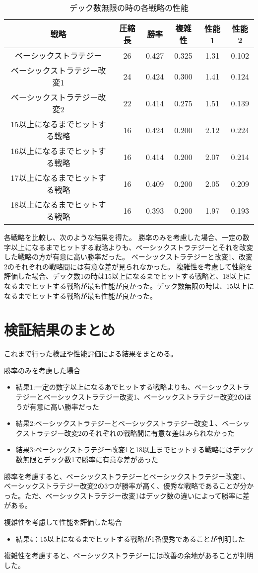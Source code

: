 \begin{table}[H]
\caption{デック数無限の時の各戦略の性能}
\label{table:data_type5}
\begin{center}
\begin{tabular}{|c|c|c|c|c|c|}
\hline
戦略           & 圧縮長 & 勝率    & 複雑性   & 性能1  & 性能2   \\ \hline
ベーシックストラテジー         & 26  & 0.427 & 0.325 & 1.31 & 0.102 \\ \hline
ベーシックストラテジー改変1      & 24  & 0.424 & 0.300  & 1.41 & 0.124 \\ \hline
ベーシックストラテジー改変2      & 22  & 0.414 & 0.275 & 1.51 & 0.139 \\ \hline
15以上になるまでヒットする戦略 & 16  & 0.424 & 0.200 & 2.12 & 0.224 \\ \hline
16以上になるまでヒットする戦略 & 16  & 0.414 & 0.200 & 2.07 & 0.214 \\ \hline
17以上になるまでヒットする戦略 & 16  & 0.409 & 0.200 & 2.05 & 0.209 \\ \hline
18以上になるまでヒットする戦略 & 16  & 0.393 & 0.200 & 1.97 & 0.193 \\ \hline
\end{tabular}
\end{center}
\end{table}

各戦略を比較し、次のような結果を得た。
勝率のみを考慮した場合、一定の数字以上になるまでヒットする戦略よりも、ベーシックストラテジーとそれを改変した戦略の方が有意に高い勝率だった。
ベーシックストラテジーと改変1、改変2のそれぞれの戦略間には有意な差が見られなかった。
複雑性を考慮して性能を評価した場合、デック数1の時は15以上になるまでヒットする戦略と、18以上になるまでヒットする戦略が最も性能が良かった。デック数無限の時は、15以上になるまでヒットする戦略が最も性能が良かった。



\section{検証結果のまとめ}
これまで行った検証や性能評価による結果をまとめる。

勝率のみを考慮した場合
\begin{itemize}
\item 結果1:一定の数字以上になるあでヒットする戦略よりも、ベーシックストラテジーとベーシックストラテジー改変1、ベーシックストラテジー改変2のほうが有意に高い勝率だった
\item 結果2:ベーシックストラテジーとベーシックストラテジー改変１、ベーシックストラテジー改変2のそれぞれの戦略間に有意な差はみられなかった
\item 結果3:ベーシックストラテジー改変1と18以上までヒットする戦略にはデック数無限とデック数1で勝率に有意な差があった
\end{itemize}

勝率を考慮すると、ベーシックストラテジーとベーシックストラテジー改変1、ベーシックストラテジー改変2の3つが勝率が高く、優秀な戦略であることが分かった。ただ、ベーシックストラテジー改変1はデック数の違いによって勝率に差がある。

複雑性を考慮して性能を評価した場合
\begin{itemize}
\item 結果4：15以上になるまでヒットする戦略が1番優秀であることが判明した
\end{itemize}

複雑性を考慮すると、ベーシックストラテジーには改善の余地があることが判明した。
